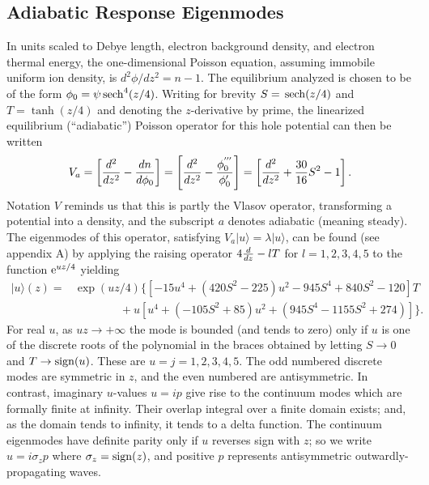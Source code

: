 \documentclass{jpp}
\def\ket#1{|#1\rangle}
\def\sech{{\,\rm sech}}
\def\etothe#1{{\rm e}^{#1}}
\begin{document}
\subsection{Adiabatic Response Eigenmodes}
In units scaled to Debye length, electron
background density, and electron thermal energy, the one-dimensional
Poisson equation, assuming immobile uniform ion density, is
$d^2\phi/dz^2=n-1$. The equilibrium analyzed is chosen to be of the
form $\phi_0=\psi\sech^4(z/4)$. Writing for brevity $S=\sech(z/4)$ and
$T=\tanh(z/4)$ and denoting the $z$-derivative by prime, the
linearized equilibrium (``adiabatic'') Poisson operator for this hole
potential can then be written
\begin{equation}
  \label{poissonop}
  V_a = \left[{d^2\over dz^2} - {dn\over d\phi_0}\right]
  = \left[{d^2\over dz^2} - {\phi_0^{'''}\over \phi_0'}\right]
  = \left[{d^2\over dz^2} +{30\over 16}S^2- 1\right].
\end{equation}
Notation $V$ reminds us that this is partly the Vlasov operator,
transforming a potential into a density, and the subscript $a$ denotes
adiabatic (meaning steady).  The eigenmodes of this
operator, satisfying $V_a\ket{u}=\lambda \ket{u}$, can be found (see
appendix A) by
applying the raising operator $4 {d\over dz}-l T$ for $l=1,2,3,4,5$ to
the function $ \etothe{uz/4}$ yielding
\begin{equation}
  \label{ketu}
  \begin{split}
 \ket{u}(z)= &\exp(uz/4)\{[-15u^4 + (420S^2 - 225)u^2 - 945S^4 +
 840S^2 - 120]T \\
 &\qquad\qquad+ u[u^4 + (-105S^2 + 85)u^2 + (945S^4 - 1155S^2
 +274)]\}.
\end{split}
\end{equation}
For real $u$, as $u z\to+\infty$ the mode is bounded (and tends to
zero) only if $u$ is one of the discrete roots of the polynomial in
the braces obtained by letting $S\to 0$ and $T\to {\rm sign}(u)$. These
are $u=j=1,2,3,4,5$. The odd numbered discrete modes are symmetric in
$z$, and the even numbered are antisymmetric. In contrast, imaginary
$u$-values $u=ip$ give rise to the continuum modes which are formally
finite at infinity. Their overlap integral over a finite domain
exists; and, as the domain tends to infinity, it tends to a delta
function. The continuum eigenmodes have definite parity only if $u$
reverses sign with $z$; so we write $u=i \sigma_z p$ where
$\sigma_z={\rm sign}(z)$, and positive $p$ represents antisymmetric
outwardly-propagating waves.
\end{document}

